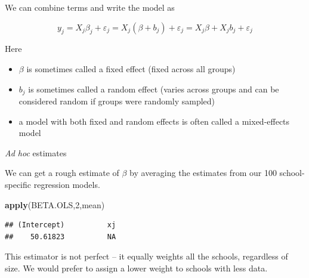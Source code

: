 \documentclass[ignorenonframetext,]{beamer}
\newenvironment{Shaded}{\begin{snugshade}}{\end{snugshade}}
\newcommand{\KeywordTok}[1]{\textcolor[rgb]{0.13,0.29,0.53}{\textbf{#1}}}
\newcommand{\DecValTok}[1]{\textcolor[rgb]{0.00,0.00,0.81}{#1}}
\newcommand{\NormalTok}[1]{#1}
\providecommand{\tightlist}{%
  \setlength{\itemsep}{0pt}\setlength{\parskip}{0pt}}
\begin{document}
\begin{frame}{}

We can combine terms and write the model as

\[y_j=X_j\beta_j+\varepsilon_j=X_j(\beta+b_j)+\varepsilon_j=X_j\beta+X_jb_j+\varepsilon_j\]

Here

\begin{itemize}
\tightlist
\item
  \(\beta\) is sometimes called a fixed effect (fixed across all groups)
\item
  \(b_j\) is sometimes called a random effect (varies across groups and
  can be considered random if groups were randomly sampled)
\item
  a model with both fixed and random effects is often called a
  mixed-effects model
\end{itemize}

\end{frame}

\begin{frame}[fragile]{\emph{Ad hoc} estimates}

We can get a rough estimate of \(\beta\) by averaging the estimates from
our 100 school-specific regression models.

\begin{Shaded}
\begin{Highlighting}[]
\KeywordTok{apply}\NormalTok{(BETA.OLS,}\DecValTok{2}\NormalTok{,mean)}
\end{Highlighting}
\end{Shaded}

\begin{verbatim}
## (Intercept)          xj 
##    50.61823          NA
\end{verbatim}

This estimator is not perfect -- it equally weights all the schools,
regardless of size. We would prefer to assign a lower weight to schools
with less data.

\end{frame}
\end{document}
